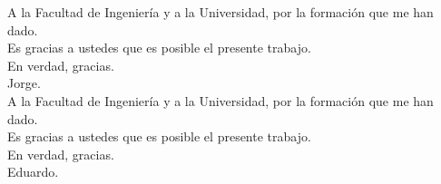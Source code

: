 \begin{dedication}
A la Facultad de Ingeniería y a la  Universidad, por la formación que me han dado.\\
Es gracias a ustedes que es posible el presente trabajo.\\
En verdad, gracias.\\
Jorge.\\
\bigskip
A la Facultad de Ingeniería y a la  Universidad, por la formación que me han dado.\\
Es gracias a ustedes que es posible el presente trabajo.\\
En verdad, gracias.\\
Eduardo.
\end{dedication}
